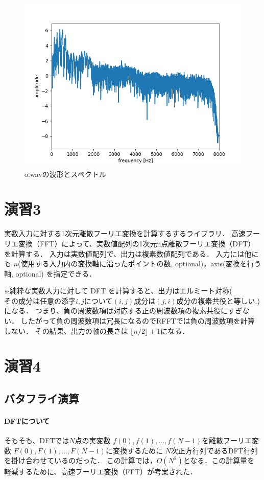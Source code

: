 \documentclass[11pt,a4j]{jarticle}%
\begin{document}
\begin{figure}[H]
  \centering
  \includegraphics[width=120mm]{img/o-plot-spectrum-whole.png}
  \caption{o.wavの波形とスペクトル}
\end{figure}

\section{演習3}
実数入力に対する1次元離散フーリエ変換を計算するするライブラリ．
高速フーリエ変換（FFT）によって、実数値配列の1次元n点離散フーリエ変換（DFT）を計算する．
入力は実数値配列で、出力は複素数値配列である．
入力には他にも $n$(使用する入力内の変換軸に沿ったポイントの数, optional)，axis(変換を行う軸, optional) を指定できる．

※純粋な実数入力に対して DFT を計算すると、出力はエルミート対称($その成分は任意の添字 i, j について (i, j)成分は (j, i)成分の複素共役と等しい.$)になる．
つまり、負の周波数項は対応する正の周波数項の複素共役にすぎない．
したがって負の周波数項は冗長になるのでRFFTでは負の周波数項を計算しない．
その結果、出力の軸の長さは $\lfloor n/2 \rfloor+ 1
$になる．
\section{演習4}
\subsection{バタフライ演算}
\paragraph{DFTについて}
そもそも、DFTでは$N$点の実変数 $f(0),f(1), ... ,f(N-1)$を離散フーリエ変数 $F(0),F(1), ... ,F(N-1)$に変換するために
$N$次正方行列であるDFT行列を掛け合わせているのだった．
この計算では，$O(N^2)$となる．この計算量を軽減するために、高速フーリエ変換（FFT）が考案された． 
\end{document}
